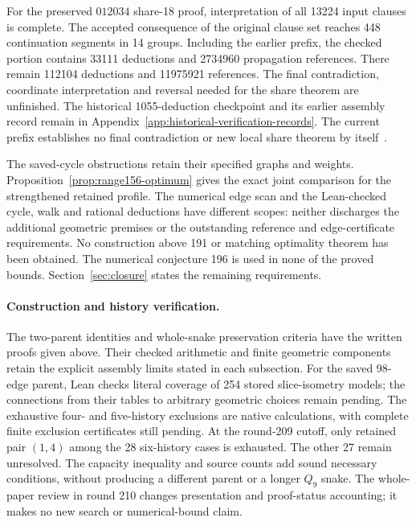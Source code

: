 \documentclass[11pt,a4paper]{article}
\theoremstyle{definition}
\theoremstyle{remark}
\begin{document}
For the preserved $012034$ share-18 proof, interpretation of all 13224
input clauses is complete. The accepted consequence of the original
clause set reaches 448 continuation segments in 14 groups. Including
the earlier prefix, the checked portion contains 33111 deductions and
2734960 propagation references. There remain 112104 deductions and
11975921 references. The final contradiction, coordinate interpretation
and reversal needed for the share theorem are unfinished. The historical
1055-deduction checkpoint and its earlier assembly record remain in
Appendix~\ref{app:historical-verification-records}. The current prefix
establishes no final contradiction or new local share theorem
by itself~\cite{replay165archive}.

The saved-cycle obstructions retain their specified graphs and weights.
Proposition~\ref{prop:range156-optimum} gives the exact joint comparison
for the strengthened retained profile. The numerical edge scan and the
Lean-checked cycle, walk and rational deductions have different scopes:
neither discharges the additional geometric premises or the outstanding
reference and edge-certificate requirements. No construction above 191 or
matching optimality theorem has been obtained. The numerical conjecture
196 is used in none of the proved bounds. Section~\ref{sec:closure} states
the remaining requirements.

\paragraph{Construction and history verification.}
The two-parent identities and whole-snake preservation criteria have the
written proofs given above. Their checked arithmetic and finite geometric
components retain the explicit assembly limits stated in each subsection.
For the saved 98-edge parent, Lean checks literal coverage of 254 stored
slice-isometry models; the connections from their tables to arbitrary
geometric choices remain pending. The exhaustive four- and five-history
exclusions are native calculations, with complete finite exclusion
certificates still pending. At the round-209 cutoff, only retained pair
$(1,4)$ among the 28 six-history cases is exhausted. The other 27 remain
unresolved. The capacity inequality and source counts add sound necessary
conditions, without producing a different parent or a longer $Q_9$ snake.
The whole-paper review in round 210 changes presentation and proof-status
accounting; it makes no new search or numerical-bound claim.
\end{document}
